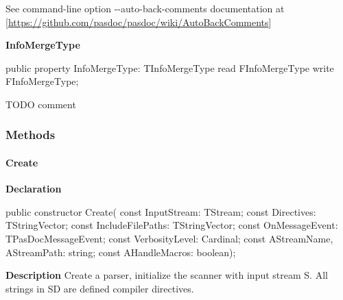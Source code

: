 \documentclass{report}
\newif\ifpdf
\begin{document}
\begin{list}{}
\begin{flushleft}
\ifpdf
\end{flushleft}
\fi


\par See command{-}line option {-}{-}auto{-}back{-}comments documentation at [\href{https://github.com/pasdoc/pasdoc/wiki/AutoBackComments}{https://github.com/pasdoc/pasdoc/wiki/AutoBackComments}]\label{PasDoc_Parser.TParser-InfoMergeType}
\item[\textbf{InfoMergeType}\hfill]
\ifpdf
\begin{flushleft}
\fi
\begin{ttfamily}
public property InfoMergeType: TInfoMergeType read FInfoMergeType write FInfoMergeType;\end{ttfamily}

\ifpdf
\end{flushleft}
\fi


\par TODO comment\end{list}
\subsubsection*{\large{\textbf{Methods}}\normalsize\hspace{1ex}\hfill}
\paragraph*{Create}\hspace*{\fill}

\label{PasDoc_Parser.TParser-Create}
\begin{list}{}{
\setlength{\itemindent}{0cm}
\setlength{\listparindent}{0cm}
\setlength{\leftmargin}{\evensidemargin}
\addtolength{\leftmargin}{\tmplength}
\settowidth{\labelsep}{X}
\addtolength{\leftmargin}{\labelsep}
\setlength{\labelwidth}{\tmplength}
}
\item[\textbf{Declaration}\hfill]
\ifpdf
\begin{flushleft}
\fi
\begin{ttfamily}
public constructor Create( const InputStream: TStream; const Directives: TStringVector; const IncludeFilePaths: TStringVector; const OnMessageEvent: TPasDocMessageEvent; const VerbosityLevel: Cardinal; const AStreamName, AStreamPath: string; const AHandleMacros: boolean);\end{ttfamily}

\ifpdf
\end{flushleft}
\fi

\par
\item[\textbf{Description}]
Create a parser, initialize the scanner with input stream S. All strings in SD are defined compiler directives.

\end{list}
\end{document}
